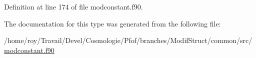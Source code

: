 Definition at line 174 of file modconstant.\-f90.



The documentation for this type was generated from the following file\-:\begin{DoxyCompactItemize}
\item 
/home/roy/\-Travail/\-Devel/\-Cosmologie/\-Pfof/branches/\-Modif\-Struct/common/src/\hyperlink{modconstant_8f90}{modconstant.\-f90}\end{DoxyCompactItemize}
